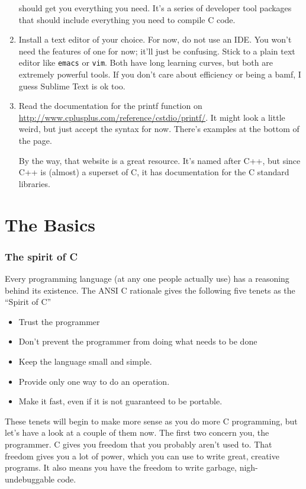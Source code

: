 \documentclass[ebook,11pt,oneside,openany]{memoir}
\begin{document}
\begin{enumerate}
should get you everything you need. It's a series of developer tool packages that should include everything you need to compile C code.

\item Install a text editor of your choice. For now, do not use an IDE. You won't need the features of one for now; it'll just be confusing. Stick to a plain text editor like \texttt{emacs} or \texttt{vim}. Both have long learning curves, but both are extremely powerful tools. If you don't care about efficiency or being a bamf, I guess Sublime Text is ok too.

\item Read the documentation for the printf function on \url{http://www.cplusplus.com/reference/cstdio/printf/}. It might look a little weird, but just accept the syntax for now. There's examples at the bottom of the page.

By the way, that website is a great resource. It's named after C++, but since C++ is (almost) a superset of C, it has documentation for the C standard libraries.

\end{enumerate}


\chapter{The Basics}
\subsection{The spirit of C}
Every programming language (at any one people actually use) has a reasoning behind its existence. The ANSI C rationale gives the following five tenets as the ``Spirit of C''

\begin{itemize}
\item Trust the programmer
\item Don't prevent the programmer from doing what needs to be done
\item Keep the language small and simple.
\item Provide only one way to do an operation.
\item Make it fast, even if it is not guaranteed to be portable.
\end{itemize}

These tenets will begin to make more sense as you do more C programming, but let's have a look at a couple of them now. The first two concern you, the programmer. C gives you freedom that you probably aren't used to. That freedom gives you a lot of power, which you can use to write great, creative programs. It also means you have the freedom to write garbage, nigh-undebuggable code.
\end{document}
